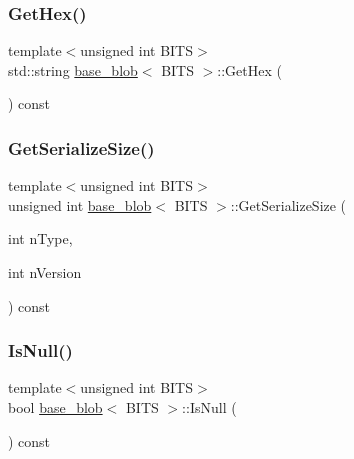 \mbox{\label{classbase__blob_ad7263503f949fb3c6c520ebb1f28e378}} 
\subsubsection{\texorpdfstring{Get\+Hex()}{GetHex()}}
{\footnotesize\ttfamily template$<$unsigned int B\+I\+TS$>$ \\
std\+::string \mbox{\hyperlink{classbase__blob}{base\+\_\+blob}}$<$ B\+I\+TS $>$\+::Get\+Hex (\begin{DoxyParamCaption}{ }\end{DoxyParamCaption}) const}

\mbox{\label{classbase__blob_ac618a70a74f5428c84d8a7f2cf080037}} 
\subsubsection{\texorpdfstring{Get\+Serialize\+Size()}{GetSerializeSize()}}
{\footnotesize\ttfamily template$<$unsigned int B\+I\+TS$>$ \\
unsigned int \mbox{\hyperlink{classbase__blob}{base\+\_\+blob}}$<$ B\+I\+TS $>$\+::Get\+Serialize\+Size (\begin{DoxyParamCaption}\item[{int}]{n\+Type,  }\item[{int}]{n\+Version }\end{DoxyParamCaption}) const\hspace{0.3cm}{\ttfamily [inline]}}

\mbox{\label{classbase__blob_aba89c6722866a5850882a509d27d7bbd}} 
\subsubsection{\texorpdfstring{Is\+Null()}{IsNull()}}
{\footnotesize\ttfamily template$<$unsigned int B\+I\+TS$>$ \\
bool \mbox{\hyperlink{classbase__blob}{base\+\_\+blob}}$<$ B\+I\+TS $>$\+::Is\+Null (\begin{DoxyParamCaption}{ }\end{DoxyParamCaption}) const\hspace{0.3cm}{\ttfamily [inline]}}


